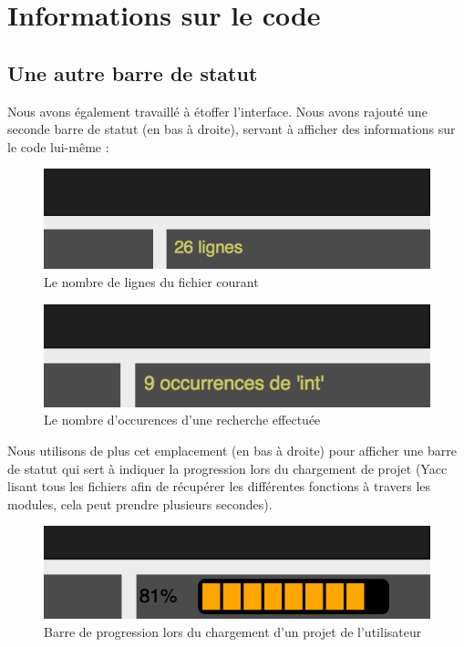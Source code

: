 \documentclass[a4paper,12pt]{article}
\begin{document}
\section{Informations sur le code}

	\subsection{Une autre barre de statut}
	
		Nous avons également travaillé à étoffer l'interface. Nous avons rajouté une seconde barre de statut (en bas à droite), servant à afficher des informations sur le code lui-même :
		
		\begin{figure}[h!]
			\begin{center}
				\includegraphics[scale=1]{images/imgs_themes/nb_lignes}
				\caption{Le nombre de lignes du fichier courant}
			\end{center}
		\end{figure}
		\begin{figure}[h!]
			\begin{center}
				\includegraphics[scale=1]{images/imgs_themes/nb_occu}
				\caption{Le nombre d'occurences d'une recherche effectuée}
			\end{center}
		\end{figure}
		
		Nous utilisons de plus cet emplacement (en bas à droite) pour afficher une barre de statut qui sert à indiquer la progression lors du chargement de projet (Yacc lisant tous les fichiers afin de récupérer les différentes fonctions à travers les modules, cela peut prendre plusieurs secondes).
		\begin{figure}[h!]
			\begin{center}
				\includegraphics[scale=1]{images/imgs_themes/progress}
				\caption{Barre de progression lors du chargement d'un projet de l'utilisateur}
			\end{center}
		\end{figure}
		
\end{document}
